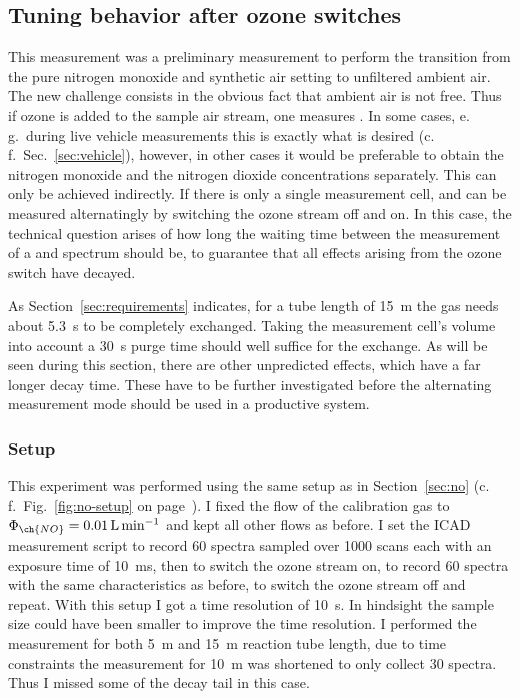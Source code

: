 \subsection{Tuning behavior after ozone switches}
\label{sec:switch}

This measurement was a preliminary measurement to perform the
transition from the pure nitrogen monoxide and synthetic air setting
to unfiltered ambient air. The new challenge consists in the obvious
fact that ambient air is not  free. Thus if ozone is added to
the sample air stream, one measures . In some
cases, e.\,g.\ during live vehicle measurements this is exactly what
is desired (c.\,f.~Sec.~\ref{sec:vehicle}), however, in other cases it
would be preferable to obtain the nitrogen monoxide and the nitrogen
dioxide concentrations separately. This can only be achieved
indirectly. If there is only a single measurement cell,  and 
can be measured alternatingly by switching the ozone stream off and
on. In this case, the technical question arises of how long the
waiting time between the measurement of a  and 
spectrum should be, to guarantee that all effects arising from the
ozone switch have decayed.

As Section~\ref{sec:requirements} indicates, for a tube length of
\SI{15}{\meter} the gas needs about \SI{5.3}{\second} to be completely
exchanged. Taking the measurement cell's volume into account a
\SI{30}{\second} purge time should well suffice for the exchange. As
will be seen during this section, there are other unpredicted effects,
which have a far longer decay time. These have to be further
investigated before the alternating measurement mode should be used in
a productive system.

\subsubsection{Setup}
\label{sec:switch-setup}

This experiment was performed using the same setup as in
Section~\ref{sec:no} (c.\,f.\ Fig.~\ref{fig:no-setup} on
page~\pageref{fig:no-setup}). I fixed the flow of the 
calibration gas to $\Phi_{\ch{NO}} = \SI{0.01}{\liter\per\minute}$ and
kept all other flows as before. I set the ICAD measurement script to
record 60 spectra sampled over 1000 scans each with an exposure time
of \SI{10}{\milli\second}, then to switch the ozone stream on, to
record 60 spectra with the same characteristics as before, to switch
the ozone stream off and repeat. With this setup I got a time
resolution of \SI{10}{\second}. In hindsight the sample size could
have been smaller to improve the time resolution. I performed the
measurement for both \SI{5}{\meter} and \SI{15}{\meter} reaction tube
length, due to time constraints the measurement for \SI{10}{\meter}
was shortened to only collect 30 spectra. Thus I missed some of the
decay tail in this case.

